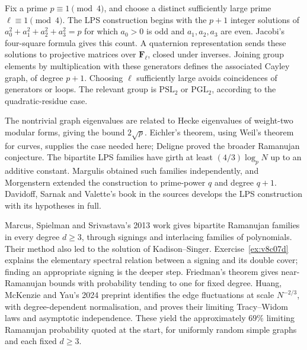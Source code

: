 
\begin{remark}
Fix a prime $p\equiv1\pmod4$, and choose a distinct sufficiently large prime $\ell\equiv1\pmod4$. The LPS construction begins with the $p+1$ integer solutions of
$a_0^2+a_1^2+a_2^2+a_3^2=p$
for which $a_0>0$ is odd and $a_1,a_2,a_3$ are even. Jacobi's four-square formula gives this count. A quaternion representation sends these solutions to projective matrices over $\mathbf F_\ell$, closed under inverses. Joining group elements by multiplication with these generators defines the associated Cayley graph, of degree $p+1$. Choosing $\ell$ sufficiently large avoids coincidences of generators or loops. The relevant group is $\mathrm{PSL}_2$ or $\mathrm{PGL}_2$, according to the quadratic-residue case.

The nontrivial graph eigenvalues are related to Hecke eigenvalues of weight-two modular forms, giving the bound $2\sqrt p$. Eichler's theorem, using Weil's theorem for curves, supplies the case needed here; Deligne proved the broader Ramanujan conjecture. The bipartite LPS families have girth at least $(4/3)\log_p N$ up to an additive constant. Margulis obtained such families independently, and Morgenstern extended the construction to prime-power $q$ and degree $q+1$. Davidoff, Sarnak and Valette's book in the sources develops the LPS construction with its hypotheses in full.
\end{remark}

\begin{remark}
Marcus, Spielman and Srivastava's 2013 work gives bipartite Ramanujan families in every degree $d\ge3$, through signings and interlacing families of polynomials. Their method also led to the solution of Kadison--Singer. Exercise~\ref{ex:v8c07d} explains the elementary spectral relation between a signing and its double cover; finding an appropriate signing is the deeper step.
Friedman's theorem gives near-Ramanujan bounds with probability tending to one for fixed degree. Huang, McKenzie and Yau's 2024 preprint identifies the edge fluctuations at scale $N^{-2/3}$, with degree-dependent normalisation, and proves their limiting Tracy--Widom laws and asymptotic independence. These yield the approximately $69\%$ limiting Ramanujan probability quoted at the start, for uniformly random simple graphs and each fixed $d\ge3$.
\end{remark}

